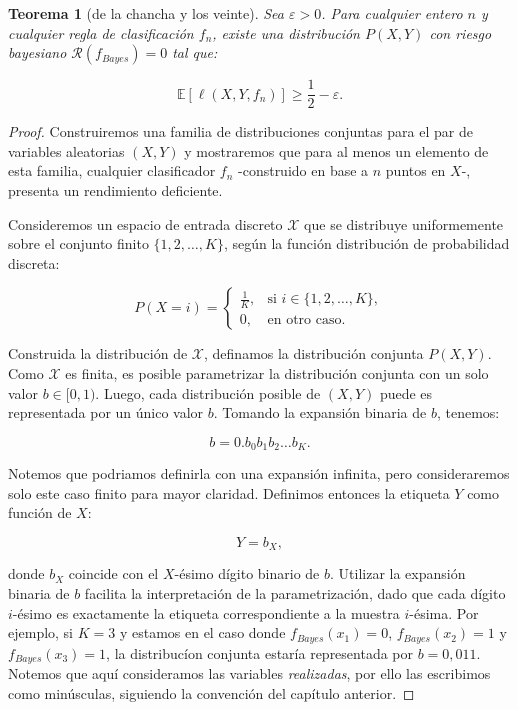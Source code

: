 \documentclass{report}
\newtheorem{thm}{Teorema}[section]
\begin{document}
\begin{thm}[de la chancha y los veinte]
Sea \(\varepsilon > 0\). Para cualquier entero \(n\) y cualquier
regla de clasificación \(f_n\), existe una distribución \(P(X, Y)\) con riesgo bayesiano
\(\mathcal{R}(f_{Bayes}) = 0\) tal que:

\[
\mathbb{E}[\ell(X,Y,f_n)] \geq \frac{1}{2} - \varepsilon.
\]
\end{thm}

\begin{proof}

Construiremos una familia de distribuciones conjuntas para el par de variables aleatorias \((X, Y)\) y mostraremos que para al menos un
elemento de esta familia, cualquier clasificador \(f_n\) -construido en base a $n$ puntos en $X$-, presenta un rendimiento deficiente.

Consideremos un espacio de entrada
discreto \(\mathcal{X}\) que se distribuye uniformemente sobre el conjunto finito \(\{1, 2, \dots, K\}\),
según la función distribución de probabilidad discreta:

\[
P(X = i) = \begin{cases}
\frac{1}{K}, & \text{si } i \in \{1, 2, \dots, K\}, \\
0, & \text{en otro caso}.
\end{cases}
\]


Construida la distribución de \(\mathcal{X}\), definamos la distribución conjunta \(P(X,Y)\). Como \(\mathcal{X}\) es finita,
es posible parametrizar la distribución conjunta con un solo valor
\(b \in [0,1)\). Luego, cada distribución posible de $(X,Y)$ puede es representada por un único valor \(b\).
Tomando la expansión binaria de $b$, tenemos:

\[
b = 0.b_0 b_1 b_2 \dots b_K.
\]

Notemos que podriamos definirla con una expansión infinita, pero consideraremos solo este caso finito para
mayor claridad. Definimos entonces la etiqueta \(Y\) como función de \(X\):

\[
Y = b_X,
\]

donde \(b_X\) coincide con el \(X\)-ésimo dígito binario de \(b\). Utilizar la expansión binaria de $b$ facilita la interpretación
de la parametrización, dado que cada dígito $i$-ésimo es exactamente la etiqueta correspondiente a la muestra $i$-ésima.
Por ejemplo, si \(K=3\) y estamos en el caso donde  \(f_{Bayes}(x_1)=0\),  \(f_{Bayes}(x_2)=1\) y \(f_{Bayes}(x_3)=1\),
la distribucíon conjunta estaría representada por $b=0,011$. Notemos que aquí consideramos las variables \emph{realizadas}, por ello
las escribimos como minúsculas, siguiendo la convención del capítulo anterior.



\end{proof}
\end{document}
